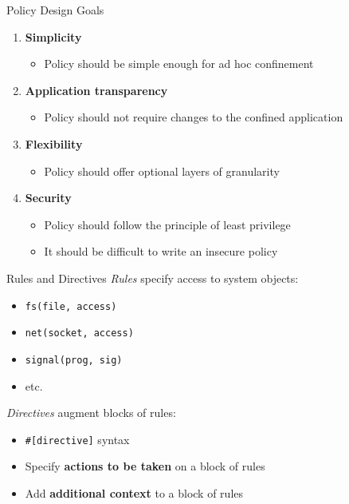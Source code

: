 \documentclass[12pt, dvipsnames, aspectratio=169]{beamer}
\begin{document}
\begin{frame}[c]{Policy Design Goals}
\begin{enumerate}
    \item \textbf{Simplicity}
    \begin{itemize}
        \item Policy should be simple enough for ad hoc confinement
    \end{itemize}
    \vfill
    \item \textbf{Application transparency}
    \begin{itemize}
        \item Policy should not require changes to the confined application
    \end{itemize}
    \vfill
    \item \textbf{Flexibility}
    \begin{itemize}
        \item Policy should offer optional layers of granularity
    \end{itemize}
    \vfill
    \item \textbf{Security}
    \begin{itemize}
        \item Policy should follow the principle of least privilege
        \item It should be difficult to write an insecure policy
    \end{itemize}
\end{enumerate}
\end{frame}

\begin{frame}[c, fragile]{Rules and Directives}
\textit{Rules} specify access to system objects:
\begin{itemize}
    \item \lstinline[language=bpfbox]|fs(file, access)|
    \item \lstinline[language=bpfbox]|net(socket, access)|
    \item \lstinline[language=bpfbox]|signal(prog, sig)|
    \item etc.
\end{itemize}

\vfill
\textit{Directives} augment blocks of rules:
\begin{itemize}
    \item \lstinline[language=bpfbox]|#[directive]| syntax
    \item Specify \textbf{actions to be taken} on a block of rules
    \item Add \textbf{additional context} to a block of rules
\end{itemize}
\end{frame}
\end{document}
